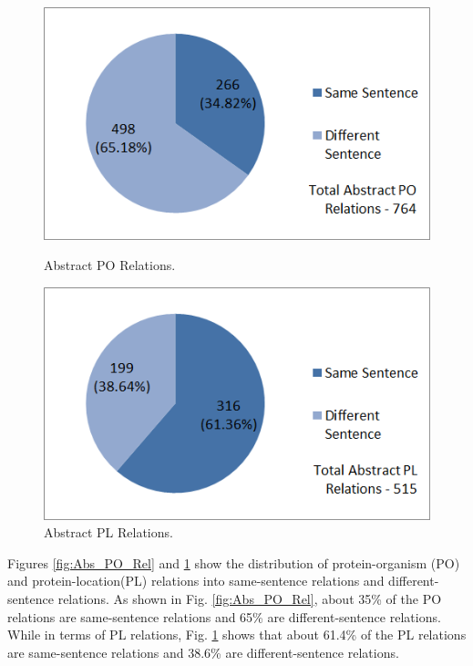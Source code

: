 \begin{figure}
\centering
\begin{minipage}{.5\textwidth}
  \centering
  \includegraphics[width=.95\textwidth]{figures/AbsPORels_sent_Distribution.png}
  \caption{Abstract PO Relations.}
  \label{fig:Abs_PO_Rel}
\end{minipage}%
\begin{minipage}{.5\textwidth}
  \centering
  \includegraphics[width=.95\textwidth]{figures/AbsPLRels_sent_Distribution.png}
  \caption{Abstract PL Relations.}
  \label{fig:Abs_PL_Rel}
\end{minipage}
\end{figure}


Figures \ref{fig:Abs_PO_Rel} and \ref{fig:Abs_PL_Rel} show the distribution of protein-organism (PO) and protein-location(PL) relations into same-sentence relations and different-sentence relations. As shown in Fig. \ref{fig:Abs_PO_Rel}, about 35\% of the PO relations are same-sentence relations and 65\% are different-sentence relations. While in terms of PL relations, Fig. \ref{fig:Abs_PL_Rel} shows that about 61.4\% of the PL relations are same-sentence relations and 38.6\% are different-sentence relations.

